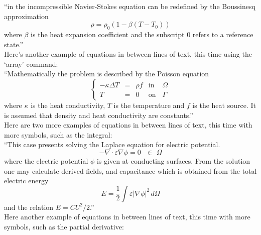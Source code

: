 ``in the incompressible Navier-Stokes equation can be redefined by the Boussinesq approximation
\begin{displaymath}
\rho = {\rho}_0(1-\beta(T-{T}_0))
\end{displaymath}
where $\beta$ is the heat expansion coefficient and the subscript 0 refers to a reference state.''\\

\noindent Here's another example of equations in between lines of text, this time using the `array' command:\\

``Mathematically the problem is described by the Poisson equation
\begin{equation}
\left \{
\begin{array}{ccccc}
- \kappa \Delta T &= &\rho f & \mathrm{ in } \, \, & \Omega \\
T&=&0 & \mathrm{ on } & \Gamma
\end{array}
\right .
\end{equation}
where $\kappa$ is the heat conductivity, $T$  is the temperature and $f$ is the heat source. It is assumed that density and heat conductivity are constants.''\\

\noindent Here are two more examples of equations in between lines of text, this time with more symbols, such as the integral:\\

``This case presents solving the Laplace equation for electric potential.
\begin{equation}
  - \nabla \cdot \varepsilon \nabla \phi = 0  \, \, \, \, \in \, \, \Omega
\end{equation}
where the electric potential $\phi$ is given at conducting surfaces.  From the solution one may calculate derived fields, and capacitance which is obtained from the total electric energy 
\begin{equation}
  E=\frac{1}{2} \int \varepsilon | \nabla \phi |^2 \, d\Omega
\end{equation}
and the relation $E=CU^2/2$.''\\

\noindent Here another example of equations in between lines of text, this time with more symbols, such as the partial derivative:\\

